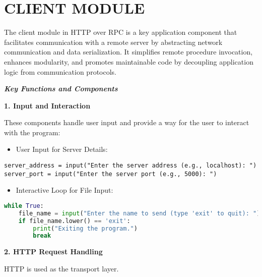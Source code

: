 \documentclass{article}
\begin{document}
\section{CLIENT MODULE} %
The client module in HTTP over RPC is a key application component that facilitates communication with a remote server by abstracting network communication and data serialization. It simplifies remote procedure invocation, enhances modularity, and promotes maintainable code by decoupling application logic from communication protocols.

\vspace{10pt}
\textbf{\textit{
Key Functions and Components}
}


\textbf{1.  Input and Interaction}

These components handle user input and provide a way for the user to interact with the program:
\begin{itemize}
    \item User Input for Server Details:
\end{itemize}

\begin{small}
\begin{lstlisting}
server_address = input("Enter the server address (e.g., localhost): ")
server_port = input("Enter the server port (e.g., 5000): ")
\end{lstlisting}
\end{small}
\begin{itemize}
    \item Interactive Loop for File Input:
\end{itemize}
\begin{small}
\begin{lstlisting}[language=Python]
while True:
    file_name = input("Enter the name to send (type 'exit' to quit): ")
    if file_name.lower() == 'exit':
        print("Exiting the program.")
        break

\end{lstlisting}
\end{small}


\textbf{2. HTTP Request Handling}

HTTP is used as the transport layer.
\end{document}
